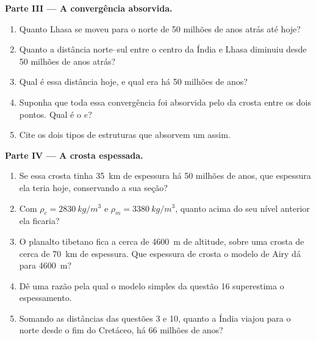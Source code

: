 \begin{problem}
\medskip
\noindent\textbf{Parte III --- A convergência absorvida.}
\begin{enumerate}[resume]
  \item Quanto Lhasa se moveu para o norte de 50 milhões de anos atrás até
        hoje?
  \item Quanto a distância norte--sul entre o centro da Índia e Lhasa
        diminuiu desde 50 milhões de anos atrás?
  \item Qual é essa distância hoje, e qual era há 50 milhões de anos?
  \item Suponha que toda essa convergência foi absorvida pelo 
        da crosta entre os dois pontos. Qual é o  $e$?
  \item Cite os dois tipos de estruturas que absorvem um  assim.
\end{enumerate}

\medskip
\noindent\textbf{Parte IV --- A crosta espessada.}
\begin{enumerate}[resume]
  \item Se essa crosta tinha \qty{35}{km} de espessura há 50 milhões de
        anos, que espessura ela teria hoje, conservando a sua seção?
  \item Com $\rho_c = \qty{2830}{kg/m^3}$ e $\rho_m = \qty{3380}{kg/m^3}$,
        quanto acima do seu nível anterior ela ficaria?
  \item O planalto tibetano fica a cerca de \qty{4600}{m} de altitude, sobre
        uma crosta de cerca de \qty{70}{km} de espessura. Que espessura de
        crosta o modelo de Airy dá para \qty{4600}{m}?
  \item Dê uma razão pela qual o modelo simples da questão 16 superestima o
        espessamento.
  \item Somando as distâncias das questões 3 e 10, quanto a Índia viajou
        para o norte desde o fim do Cretáceo, há 66 milhões de anos?
\end{enumerate}
\end{problem}
